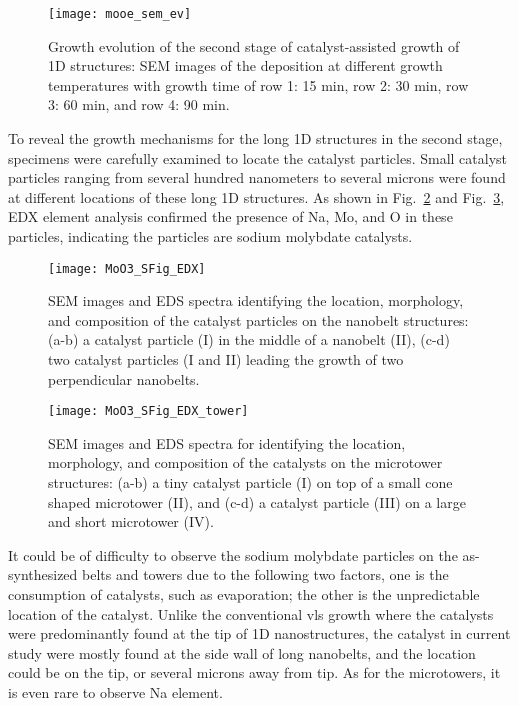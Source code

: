 \begin{figure}[htb]
\centering
\texttt{[image: mooe\_sem\_ev]}
\caption[Growth evolution of the second stage of catalyst-assisted growth of  1D structures]{Growth evolution of the second stage of catalyst-assisted growth of  1D structures: SEM images of the deposition at different growth temperatures with growth time of row 1: 15 min, row 2: 30 min, row 3: 60 min, and row 4: 90 min.}
\label{fig:ch4ev}
\end{figure}

To reveal the growth mechanisms for the long 1D structures in the second stage, specimens were carefully examined to locate the catalyst particles. Small catalyst particles ranging from several hundred nanometers to several microns were found at different locations of these long 1D structures. As shown in Fig.~\ref{fig:ch4edx1} and Fig.~\ref{fig:ch4edx2}, EDX element analysis confirmed the presence of Na, Mo, and O in these particles, indicating the particles are sodium molybdate catalysts.  

\begin{figure}[htb]
\centering
\texttt{[image: MoO3\_SFig\_EDX]}
\caption[SEM images and EDS spectra identifying the location, morphology, and composition of the catalyst particles on the nanobelt structures]{SEM images and EDS spectra identifying the location, morphology, and composition of the catalyst particles on the nanobelt structures: (a-b) a catalyst particle (I) in the middle of a nanobelt (II), (c-d) two catalyst particles (I and II) leading the growth of two perpendicular nanobelts. }
\label{fig:ch4edx1}
\end{figure}

\begin{figure}[htb]
\centering
\texttt{[image: MoO3\_SFig\_EDX\_tower]}
\caption[SEM images and EDS spectra for identifying the location, morphology, and composition of the catalysts on the microtower structures]{SEM images and EDS spectra for identifying the location, morphology, and composition of the catalysts on the microtower structures: (a-b) a tiny catalyst particle (I) on top of a small cone shaped microtower (II), and (c-d) a catalyst particle (III) on a large and short microtower (IV).}
\label{fig:ch4edx2}
\end{figure}
It could be of difficulty to observe the sodium molybdate particles on the as-synthesized belts and towers due to the following two factors, one is the consumption of catalysts, such as evaporation; the other is the unpredictable location of the catalyst. Unlike the conventional \gls{vls} growth where the catalysts were predominantly found at the tip of 1D nanostructures, the catalyst in current study were mostly found at the side wall of long nanobelts, and the location could be on the tip, or several microns away from tip. As for the microtowers, it is even rare to observe Na element.

